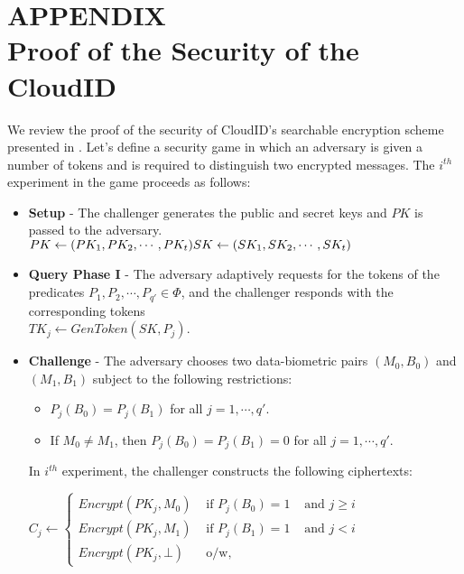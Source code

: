 \section*{APPENDIX \\ Proof of the Security of the CloudID}\label{sec-appendix}

We review the proof of the security of CloudID's searchable encryption scheme presented in \cite{haghighat2015cloudid}. Let's define a security game in which an adversary is given a number of tokens and is required to distinguish two encrypted messages.
The $i^{th}$ experiment in the game proceeds as follows:

\begin{itemize}

\item \textbf{Setup} - The challenger generates the public and secret keys and $PK$ is passed to the adversary. \\
$
  PK \leftarrow (PK_1, PK_2, \cdots, PK_t)\\
  SK \leftarrow (SK_1, SK_2, \cdots, SK_t)
$

\item \textbf{Query Phase I} - The adversary adaptively requests for the tokens of the predicates $P_1, P_2, \cdots,P_{q'} \in \Phi$, and the challenger responds with the corresponding tokens\\
$TK_j \leftarrow GenToken(SK,P_j)$.

\item \textbf{Challenge} - The adversary chooses two data-biometric pairs $(M_0,B_0)$ and $(M_1,B_1)$ subject to the following restrictions:
\begin{itemize}
 \item $P_j(B_0) = P_j(B_1)$ for all $j = 1, \cdots, q'$.
 \item If $M_0 \neq M_1$, then $P_j(B_0) = P_j(B_1) = 0$ for all $j = 1, \cdots, q'$.
\end{itemize}

In $i^{th}$ experiment, the challenger constructs the following ciphertexts:

$
  C_j \leftarrow \left\{
  \begin{array}{lll}
    Encrypt(PK_j, M_0)		&\mbox{ if  $P_j(B_0) = 1$} &\mbox{ and $j \geq i$}\\
    Encrypt(PK_j, M_1)		&\mbox{ if  $P_j(B_1) = 1$} &\mbox{ and $j < i$}\\
    Encrypt(PK_j, \bot)		&\mbox{ o/w}, &
  \end{array} \right.
$


\end{itemize}
